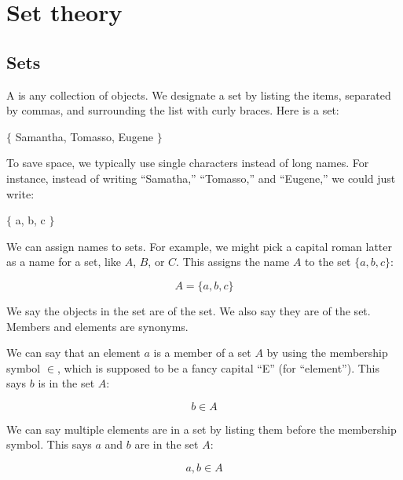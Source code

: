 \documentclass[../../../main.tex]{subfiles}
\begin{document}
\chapter{Set theory}


\section{Sets}

A  is any collection of objects. We designate a set by listing the items, separated by commas, and surrounding the list with curly braces. Here is a set:

\begin{center}
$\{$ Samantha, Tomasso, Eugene $\}$
\end{center}

\noindent
To save space, we typically use single characters instead of long names. For instance, instead of writing ``Samatha,'' ``Tomasso,'' and ``Eugene,'' we could just write:

\begin{center}
$\{$ a, b, c $\}$
\end{center}

\noindent
We can assign names to sets. For example, we might pick a capital roman latter as a name for a set, like $A$, $B$, or $C$. This assigns the name $A$ to the set $\{ a, b, c \}$:

\begin{equation*}
A = \{ a, b, c \}
\end{equation*}

\noindent
We say the objects in the set are  of the set. We also say they are  of the set. Members and elements are synonyms.

We can say that an element $a$ is a member of a set $A$ by using the membership symbol $\in$, which is supposed to be a fancy capital ``E'' (for ``element''). This says $b$ is in the set $A$:

\begin{equation*}
b \in A
\end{equation*}

\noindent
We can say multiple elements are in a set by listing them before the membership symbol. This says $a$ and $b$ are in the set $A$:

\begin{equation*}
a, b \in A
\end{equation*}
\end{document}
